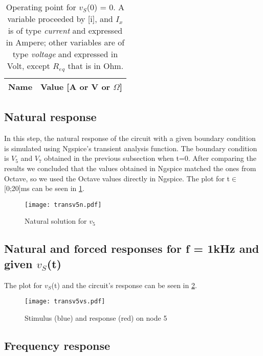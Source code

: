 \begin{table}[h]
  \centering
  \begin{tabular}{|l|r|}
    \hline    
    {\bf Name} & {\bf Value [A or V or $\Omega$]} \\ \hline
    
  \end{tabular}
  \caption{Operating point for $v_S$(0) = 0. A variable proceeded by [i], and $I_x$ is of type {\em current}
    and expressed in Ampere; other variables are of type {\it voltage} and expressed in
    Volt, except $R_e$$_q$ that is in Ohm.}
  \label{tab:op_2}
\end{table}
\FloatBarrier

\subsection{Natural response}

In this step, the natural response of the circuit with a given boundary condition is simulated using Ngspice's transient analysis function. The boundary condition is $V_5$ and $V_7$ obtained in the previous subsection when t=0. After comparing the results we concluded that the values obtained in Ngspice matched the ones from Octave, so we used the Octave values directly in Ngspice. The plot for t$\in$[0;20]ms can be seen in \ref{fig:v5_ng}. 

\begin{figure}[h] \centering
\texttt{[image: transv5n.pdf]}
\caption{Natural solution for $v_5$}
\label{fig:v5_ng}
\end{figure}
\FloatBarrier

\subsection{Natural and forced responses for f = 1kHz and given $v_S$(t)}

The plot for $v_S$(t) and the circuit's response can be seen in \ref{fig:transv5vs.pdf}.

\begin{figure}[h] \centering
\texttt{[image: transv5vs.pdf]}
\caption{Stimulus (blue) and response (red) on node 5}
\label{fig:transv5vs.pdf}
\end{figure}
\FloatBarrier


\subsection{Frequency response}

